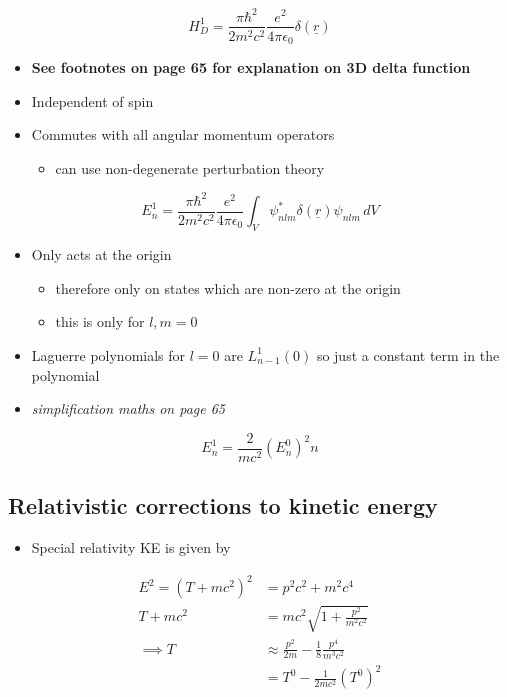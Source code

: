 \documentclass[a4paper,11pt,normalem]{article}
\begin{document}
\[
    H_D^1 = \frac{\pi\hbar^2}{2m^2c^2}\frac{e^2}{4\pi\epsilon_0}\delta(\underline{r})
\]

\begin{itemize}
\item
  \textbf{See footnotes on page 65 for explanation on 3D delta function}
\item
  Independent of spin
\item
  Commutes with all angular momentum operators
  \begin{itemize}
  \item
    can use non-degenerate perturbation theory
  \end{itemize}
\end{itemize}

\[
    E_n^1 = \frac{\pi\hbar^2}{2m^2c^2}\frac{e^2}{4\pi\epsilon_0}\int_V \psi^* _{nlm} \delta(\underline{r}) \psi_{nlm}\,dV
\]

\begin{itemize}
\item
  Only acts at the origin
  \begin{itemize}
  \item
    therefore only on states which are non-zero at the origin
  \item
    this is only for \(l, m = 0\)
  \end{itemize}
\item
  Laguerre polynomials for \(l = 0\) are \(L_{n-1}^1 (0)\) so just a
  constant term in the polynomial
\item
  \emph{simplification maths on page 65}
\end{itemize}

\[
    E_n^1 = \frac{2}{mc^2}(E_n^0)^2 n
\]

\subsection{Relativistic corrections to kinetic energy}\label{relativistic-corrections-to-kinetic-energy}

\begin{itemize}
\item
  Special relativity KE is given by
\end{itemize}

\[
    \begin{aligned}
    E^2 = (T + mc^2)^2& = p^2c^2 + m^2c^4 \\
    T + mc^2 &= mc^2\sqrt{1 + \frac{p^2}{m^2c^2}} \\
    \implies T &\approx \frac{p^2}{2m} - \frac{1}{8}\frac{p^4}{m^3c^2} \\
    &= T^0 - \frac{1}{2mc^2}(T^0)^2
    \end{aligned}
\]
\end{document}
